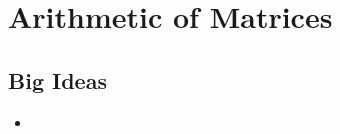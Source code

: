 \chapter{Arithmetic of Matrices}
\label{chap:AM}

\section{Big Ideas}
\label{sec:AM Big Ideas}
\begin{itemize}
  \item 
\end{itemize}